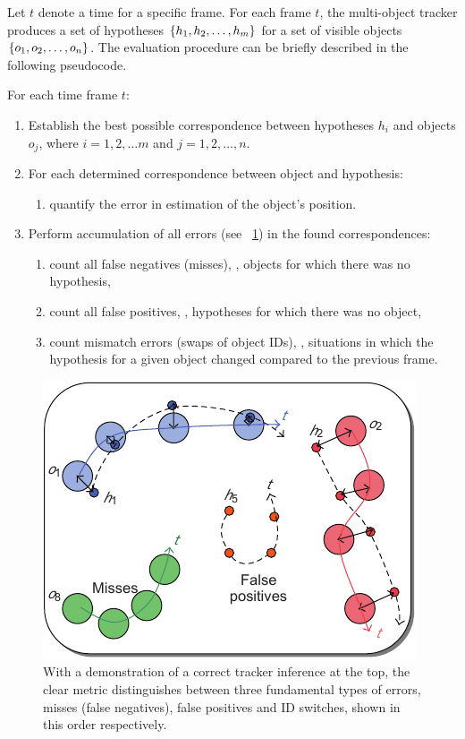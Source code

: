 Let $t$ denote a time for a specific frame. For each frame $t$, the multi-object tracker produces a set of hypotheses $\left\{ {h_1, h_2, \dots, h_m} \right\}$ for a set of visible objects $\left\{ {o_1, o_2, \dots, o_n} \right\}$. The evaluation procedure can be briefly described in the following pseudocode.

For each time frame $t$:
\begin{enumerate}
    \item Establish the best possible correspondence between hypotheses $h_i$ and objects $o_j$, where $i = 1, 2, \dots m$ and $j = 1, 2, \dots, n$.
    \item For each determined correspondence between object and hypothesis:
          \begin{enumerate}
              \item quantify the error in estimation of the object's position.
          \end{enumerate}
    \item Perform accumulation of all errors (see \figtext{}~\ref{fig:CLEARHypotheses}) in the found correspondences:
          \begin{enumerate}
              \item count all false negatives (misses), \ietext{}, objects for which there was no hypothesis,
              \item count all false positives, \ietext{}, hypotheses for which there was no object,
              \item count mismatch errors (swaps of object IDs), \ietext{}, situations in which the hypothesis for a given object changed compared to the previous frame.
          \end{enumerate}
\end{enumerate}

\begin{figure}[t]
    \centerline{\includegraphics[width=0.55\linewidth]{figures/theoretical_foundations/clear_hypotheses_status.pdf}}
    \caption[\gls{clear} hypotheses]{With a demonstration of a correct tracker inference at the top, the \gls{clear} metric distinguishes between three fundamental types of errors, misses (false negatives), false positives and ID switches, shown in this order respectively. }
    \label{fig:CLEARHypotheses}
\end{figure}

